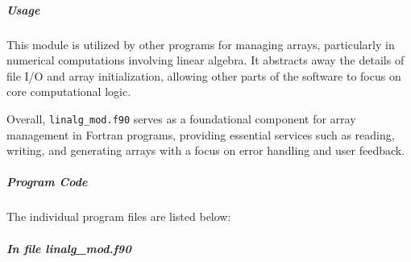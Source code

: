\subparagraph{Usage}

This module is utilized by other programs for managing arrays, particularly in numerical computations involving linear algebra. It abstracts away the details of file I/O and array initialization, allowing other parts of the software to focus on core computational logic.

Overall, \texttt{linalg\_mod.f90} serves as a foundational component for array management in Fortran programs, providing essential services such as reading, writing, and generating arrays with a focus on error handling and user feedback.

\subparagraph{Program Code}

The individual program files are listed below:

\subparagraph{In file linalg\_mod.f90}

